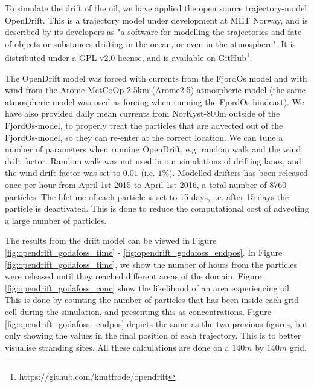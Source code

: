 To simulate the drift of the oil, we have applied the open source trajectory-model OpenDrift. This is a trajectory model under development at MET Norway, and is described by its developers as "a software for modelling the trajectories and fate of objects or substances drifting in the ocean, or even in the atmosphere". It is distributed under a GPL v2.0 license, and is available on GitHub\footnote{https://github.com/knutfrode/opendrift}.

The OpenDrift model was forced with currents from the FjordOs model and with wind from the Arome-MetCoOp 2.5km (Arome2.5) atmospheric model (the same atmospheric model was used as forcing when running the FjordOs hindcast). We have also provided daily mean currents from NorKyst-800m outside of the FjordOs-model, to properly treat the particles that are advected out of the FjordOs-model, so they can re-enter at the correct location. We can tune a number of parameters when running OpenDrift, e.g. random walk and the wind drift factor. Random walk was not used in our simulations of drifting lanes, and the wind drift factor was set to $0.01$ (i.e. $1\%$). Modelled drifters has been released once per hour from April 1st 2015 to April 1st 2016, a total number of 8760 particles. The lifetime of each particle is set to 15 days, i.e. after 15 days the particle is deactivated. This is done to reduce the computational cost of advecting a large number of particles. 

The results from the drift model can be viewed in Figure \ref{fig:opendrift_godafoss_time} - \ref{fig:opendrift_godafoss_endpos}. In Figure \ref{fig:opendrift_godafoss_time}, we show the number of hours from the particles were released until they reached different areas of the domain. Figure \ref{fig:opendrift_godafoss_conc} show the likelihood of an area experiencing oil. This is done by counting the number of particles that has been inside each grid cell during the simulation, and presenting this as concentrations. Figure \ref{fig:opendrift_godafoss_endpos} depicts the same as the two previous figures, but only showing the values in the final position of each trajectory. This is to better visualise stranding sites. All these calculations are done on a $140m$ by $140m$ grid.

